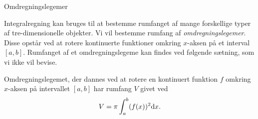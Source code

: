 \documentclass[12pt]{article}
\begin{document}



\begin{center}
\Huge
Omdregningslegemer
\end{center}
Integralregning kan bruges til at bestemme rumfanget af mange forskellige typer af tre-dimensionelle objekter. Vi vil bestemme rumfang af \textit{omdregningslegemer}. Disse opstår ved at rotere kontinuerte funktioner omkring $x$-aksen på et interval $[a,b]$. Rumfanget af et omdregningslegeme kan findes ved følgende sætning, som vi ikke vil bevise. 
\begin{setn}\label{setn:omdreg}
Omdregningslegemet, der dannes ved at rotere en kontinuert funktion $f$ omkring $x$-aksen på intervallet $[a,b]$ har rumfang $V$ givet ved
\begin{align*}
V = \pi\int_a^b (f(x))^2 \textnormal{d} x.
\end{align*}
\end{setn}
\end{document}
